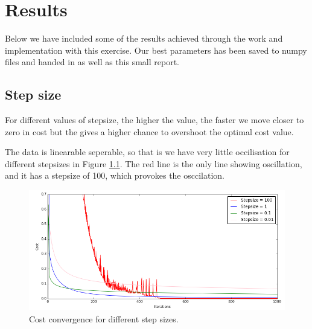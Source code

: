 \documentclass[a4paper,10pt,article,oneside,english]{memoir}
\begin{document}
\chapter{Results}\label{sec:res}
Below we have included some of the results achieved through the work and implementation with this exercise. Our best parameters has been saved to numpy files and handed in as well as this small report.

\section{Step size}\label{sec:stepsize}
For different values of stepsize, the higher the value, the faster we move closer to zero in cost but the gives a higher chance to overshoot the optimal cost value. 

The data is linearable seperable, so that is we have very little occilisation for different stepsizes in Figure \ref{fig:stepsize}. The red line is the only line showing oscillation, and it has a stepsize of 100, which provokes the osccilation.
\begin{figure}[h!]
	\centering
	\includegraphics[width=\linewidth]{nll_plot1v2.png}
	\caption{Cost convergence for different step sizes.}
	\label{fig:stepsize}
\end{figure}
\end{document}
